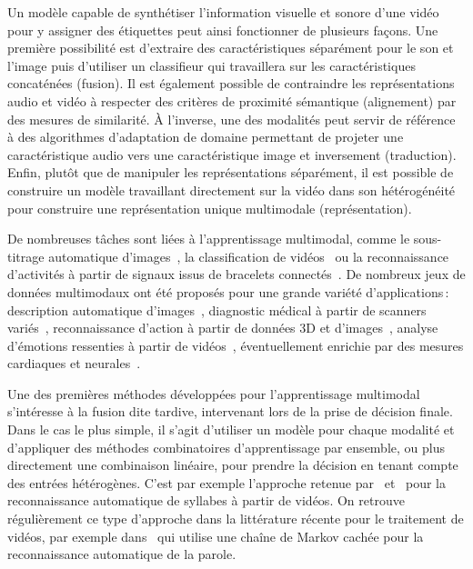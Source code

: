 Un modèle capable de synthétiser l'information visuelle et sonore d'une vidéo pour y assigner des étiquettes peut ainsi fonctionner de plusieurs façons. Une première possibilité est d'extraire des caractéristiques séparément pour le son et l'image puis d'utiliser un classifieur qui travaillera sur les caractéristiques concaténées (fusion). Il est également possible de contraindre les représentations audio et vidéo à respecter des critères de proximité sémantique (alignement) par des mesures de similarité. À l'inverse, une des modalités peut servir de référence à des algorithmes d'adaptation de domaine permettant de projeter une caractéristique audio vers une caractéristique image et inversement (traduction). Enfin, plutôt que de manipuler les représentations séparément, il est possible de construire un modèle travaillant directement sur la vidéo dans son hétérogénéité pour construire une représentation unique multimodale (représentation).

De nombreuses tâches sont liées à l'apprentissage multimodal, comme le sous-titrage automatique d'images~\cite{karpathy_deep_2015}, la classification de vidéos~\cite{kim_deep_2013} ou la reconnaissance d'activités à partir de signaux issus de bracelets connectés~\cite{ordonez_deep_2016}. De nombreux jeux de données multimodaux ont été proposés pour une grande variété d'applications\,: description automatique d'images~\cite{hodosh_framing_2013}, diagnostic médical à partir de scanners variés~\cite{menze_multimodal_2015}, reconnaissance d'action à partir de données 3D et d'images~\cite{ofli_berkeley_2013}, analyse d'émotions ressenties à partir de vidéos~\cite{schuller_avec_2011}, éventuellement enrichie par des mesures cardiaques et neurales~\cite{ringeval_introducing_2013}.

Une des premières méthodes développées pour l'apprentissage multimodal s'intéresse à la fusion dite tardive, intervenant lors de la prise de décision finale. Dans le cas le plus simple, il s'agit d'utiliser un modèle pour chaque modalité et d'appliquer des méthodes combinatoires d'apprentissage par ensemble, ou plus directement une combinaison linéaire, pour prendre la décision en tenant compte des entrées hétérogènes. C'est par exemple l'approche retenue par~\citet{yuhas_integration_1989} et~\citet{meier_adaptive_1996} pour la reconnaissance automatique de syllabes à partir de vidéos. On retrouve régulièrement ce type d'approche dans la littérature récente pour le traitement de vidéos, par exemple dans~\cite{noda_audio-visual_2015} qui utilise une chaîne de Markov cachée pour la reconnaissance automatique de la parole.

